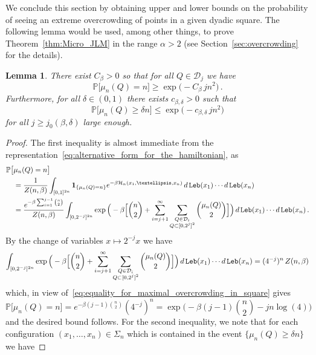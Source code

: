 \documentclass[11pt]{amsart}
\newtheorem{lemma}[theorem]{Lemma}
\theoremstyle{definition}
\theoremstyle{remark}
\numberwithin{equation}{section}
\newcommand{\bP}{\mathbb P}
\begin{document}
	We conclude this section by obtaining upper and lower bounds on the probability of seeing an extreme overcrowding of points in a given dyadic square. The following lemma would be used, among other things, to prove Theorem~\ref{thm:Micro_JLM} in the range $\alpha> 2$ (see Section~\ref{sec:overcrowding} for the details).
	\begin{lemma}
		\label{lemma:overcrowding_probability_in_dyadic_cube}
		There exist $C_\beta>0$ so that for all $Q\in \mathcal{D}_j$ we have
		\[
		\bP\big[\mu_n(Q) = n\big] \ge \exp\Big(-C_\beta \, j n^2\Big)\, .
		\] 
		Furthermore, for all $\delta\in(0,1)$ there exists $c_{\beta,\delta}>0$ such that
		\[
		\bP\big[\mu_n(Q) \ge \delta n\big] \le \exp\Big(-c_{\beta,\delta} \, j n^2\Big)
		\]
		for all $j\ge j_0(\beta,\delta)$ large enough.
	\end{lemma}
	\begin{proof}
		The first inequality is almost immediate from the representation~\eqref{eq:alternative_form_for_the_hamiltonian}, as
		\begin{align}
			\label{eq:equality_for_maximal_overcrowding_in_square}
			\nonumber
			\bP\big[&\mu_n(Q) = n\big] \\ \nonumber &= \frac{1}{Z(n,\beta)} \int_{[0,1]^{2n}} \mathbf{1}_{\{\mu_n(Q) = n\}}e^{-\beta\mathcal{H}_n(x_1,\ldots,x_n)} \, {\rm d} \, {\tt Leb}(x_1)\cdots {\rm d} \, {\tt Leb}(x_n) \\ &=  \frac{e^{-\beta\sum_{i=1}^{j-1} \binom{n}{2}}}{Z(n,\beta)}\int_{[0,2^{-j}]^{2n}} \exp\Big(-\beta\Big[\binom{n}{2} + \sum_{i=j+1}^{\infty} \sum_{\substack{Q\in \mathcal{D}_i\\ Q\subset [0,2^{j}]^2}}\binom{\mu_n(Q)}{2}\Big]\Big) \, {\rm d} \, {\tt Leb}(x_1)\cdots {\rm d} \, {\tt Leb}(x_n) \, . 
		\end{align}
		By the change of variables $x\mapsto 2^{-j}x$ we have 
		\[
		\int_{[0,2^{-j}]^{2n}} \exp\Big(-\beta\Big[\binom{n}{2} + \sum_{i=j+1}^{\infty} \sum_{\substack{Q\in \mathcal{D}_i\\ Q\subset [0,2^{j}]^2}}\binom{\mu_n(Q)}{2}\Big]\Big) \, {\rm d} \, {\tt Leb}(x_1)\cdots {\rm d} \, {\tt Leb}(x_n)= (4^{-j})^n \, Z(n,\beta)
		\]
		which, in view of~\eqref{eq:equality_for_maximal_overcrowding_in_square} gives
		\[
		\bP\big[\mu_n(Q) = n\big] = e^{-\beta (j-1) \binom{n}{2}} (4^{-j})^n = \exp\Big(-\beta (j-1) \binom{n}{2} - jn \log(4)\Big)
		\]
		and the desired bound follows. For the second inequality, we note that for each configuration $(x_1,\ldots,x_n)\in\Sigma_n$ which is contained in the event $\{\mu_n(Q) \ge \delta n\}$ we have

\end{proof}
\end{document}
